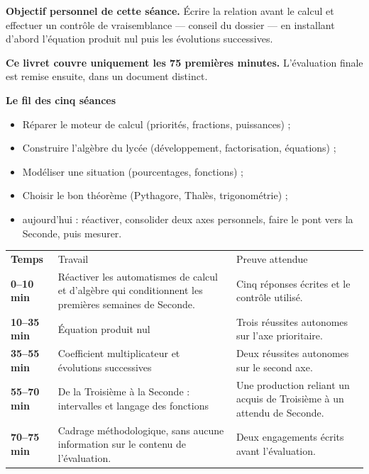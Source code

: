 \documentclass[10pt,a4paper]{article}
\begin{document}
\begin{goalbox}
\textbf{Objectif personnel de cette séance.} Écrire la relation avant le calcul et effectuer un contrôle de vraisemblance — conseil du dossier — en installant d'abord l'équation produit nul puis les évolutions successives.
\par\medskip
\textbf{Ce livret couvre uniquement les 75 premières minutes.} L'évaluation finale est remise ensuite, dans un document distinct.
\end{goalbox}
\begin{methodbox}
\textbf{Le fil des cinq séances}
\begin{itemize}[leftmargin=13mm,labelsep=3mm,itemsep=1.5pt]
\item[\textbf{\color{Navy}S1}] Réparer le moteur de calcul (priorités, fractions, puissances) ;
\item[\textbf{\color{Navy}S2}] Construire l'algèbre du lycée (développement, factorisation, équations) ;
\item[\textbf{\color{Navy}S3}] Modéliser une situation (pourcentages, fonctions) ;
\item[\textbf{\color{Navy}S4}] Choisir le bon théorème (Pythagore, Thalès, trigonométrie) ;
\item[\textbf{\color{Navy}S5}] aujourd'hui : réactiver, consolider deux axes personnels, faire le pont vers la Seconde, puis mesurer.
\end{itemize}
\end{methodbox}
\par\noindent\begin{tabularx}{\linewidth}{>{\bfseries}p{20mm} X X}
\rowcolor{Navy}\color{white}Temps & \color{white}Travail & \color{white}Preuve attendue \\
0--10 min & Réactiver les automatismes de calcul et d'algèbre qui conditionnent les premières semaines de Seconde. & Cinq réponses écrites et le contrôle utilisé. \\
10--35 min & Équation produit nul & Trois réussites autonomes sur l'axe prioritaire. \\
35--55 min & Coefficient multiplicateur et évolutions successives & Deux réussites autonomes sur le second axe. \\
55--70 min & De la Troisième à la Seconde : intervalles et langage des fonctions & Une production reliant un acquis de Troisième à un attendu de Seconde. \\
70--75 min & Cadrage méthodologique, sans aucune information sur le contenu de l'évaluation. & Deux engagements écrits avant l'évaluation. \\
\end{tabularx}
\end{document}

